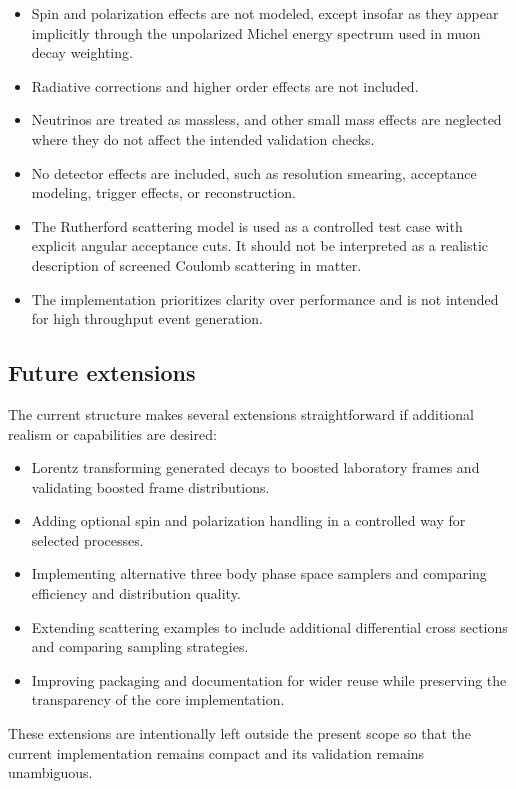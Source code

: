 \documentclass[11pt,a4paper]{article}
\begin{document}
\begin{itemize}
  \item Spin and polarization effects are not modeled, except insofar as they appear
  implicitly through the unpolarized Michel energy spectrum used in muon decay weighting.
  \item Radiative corrections and higher order effects are not included.
  \item Neutrinos are treated as massless, and other small mass effects are neglected where
  they do not affect the intended validation checks.
  \item No detector effects are included, such as resolution smearing, acceptance modeling,
  trigger effects, or reconstruction.
  \item The Rutherford scattering model is used as a controlled test case with explicit
  angular acceptance cuts. It should not be interpreted as a realistic description of
  screened Coulomb scattering in matter.
  \item The implementation prioritizes clarity over performance and is not intended for
  high throughput event generation.
\end{itemize}

\subsection{Future extensions}

The current structure makes several extensions straightforward if additional realism or
capabilities are desired:
\begin{itemize}
  \item Lorentz transforming generated decays to boosted laboratory frames and validating
  boosted frame distributions.
  \item Adding optional spin and polarization handling in a controlled way for selected
  processes.
  \item Implementing alternative three body phase space samplers and comparing efficiency
  and distribution quality.
  \item Extending scattering examples to include additional differential cross sections and
  comparing sampling strategies.
  \item Improving packaging and documentation for wider reuse while preserving the
  transparency of the core implementation.
\end{itemize}

These extensions are intentionally left outside the present scope so that the current
implementation remains compact and its validation remains unambiguous.
\end{document}
